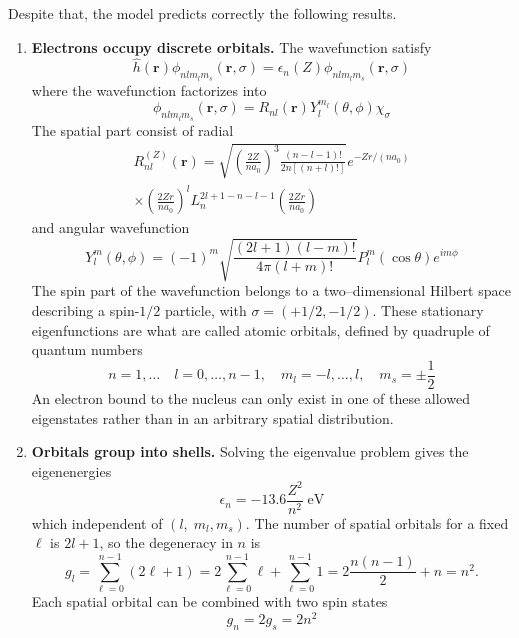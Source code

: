\documentclass[../../../main.tex]{subfiles}
\begin{document}
Despite that, the model predicts correctly the following results.
\begin{enumerate}
  \item \textbf{Electrons occupy discrete orbitals.} The wavefunction satisfy
        \begin{equation*}
          \hat{h}(\mathbf{r }) \phi_{nlm_lm_s}(\mathbf{r},\sigma) = \epsilon_{n}(Z) \phi_{nlm_lm_{s}}(\mathbf{r},\sigma)
        \end{equation*}
        where the wavefunction factorizes into
        \begin{equation*}
          \phi_{nlm_lm_{s}}(\mathbf{r},\sigma) = R_{nl}(\mathbf{r}) Y_{l}^{m_l}(\theta, \phi)\chi_{\sigma}
        \end{equation*}
        The spatial part consist of radial
        \begin{multline*}
          R_{nl }^{(Z)}(\mathbf{r}) = \sqrt{ \left( \frac{2Z}{na_0} \right)^{3} \frac{(n - l  - 1)!}{2n[(n + l )!]} } e^{-Zr/(na_0)} \\ \times\left( \frac{2Zr}{na_0} \right)^{l } L_{n}^{2l  + 1 - n - l  - 1} \left( \frac{2Zr}{na_0} \right)
        \end{multline*}
        and angular wavefunction
        \begin{equation*}
          Y_{l }^{m}(\theta, \phi) = (-1)^{m} \sqrt{\frac{(2l  + 1)(l  - m)!}{4\pi(l  + m)!}} P_{l }^{m}(\cos \theta) e^{im\phi}
        \end{equation*}
        The spin part of the wavefunction belongs to a two–dimensional Hilbert space describing a spin-$1/2$ particle, with $\sigma=(+1/2,-1/2)$.
        These stationary eigenfunctions are what are called atomic orbitals, defined by quadruple of quantum numbers
        \begin{equation*}
          n = 1,\ldots \quad l = 0, \ldots, n - 1, \quad m_{l } = -l , \ldots, l , \quad m_{s} = \pm \frac{1}{2}
        \end{equation*}
        An electron bound to the nucleus can only exist in one of these allowed eigenstates rather than in an arbitrary spatial distribution.

  \item \textbf{Orbitals group into shells.} Solving the eigenvalue problem gives the eigenenergies
        \begin{equation*}
          \epsilon_n = - 13.6\frac{Z^2}{n^2}  \; \text{eV}
        \end{equation*}
        which independent of $(l, \; m_l,  m_s)$.
        The number of spatial orbitals for a fixed $\ell$ is $2l+1$, so the degeneracy in $n$ is
        \begin{equation*}
          g_l =\sum_{\ell=0}^{n-1} (2\ell + 1)
          = 2 \sum_{\ell=0}^{n-1} \ell + \sum_{\ell=0}^{n-1} 1
          = 2 \frac{n(n-1)}{2} + n = n^2.
        \end{equation*}
        Each spatial orbital can be combined with two spin states
        \begin{equation*}
          g_n = 2g_s=2n^2
        \end{equation*}


\end{enumerate}
\end{document}
